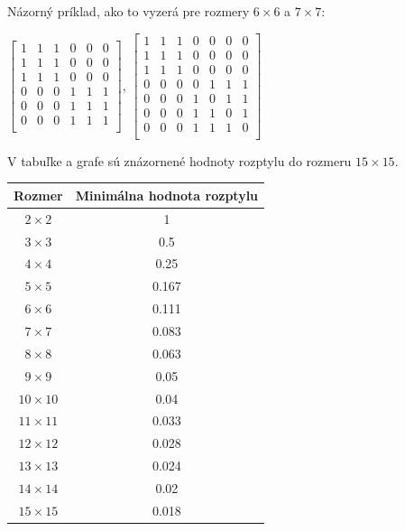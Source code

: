 Názorný príklad, ako to vyzerá pre rozmery $6 \times 6$ a $7 \times 7$:

\begin{center}
$
\begin{bmatrix}
1 & 1 & 1 & 0 & 0 & 0 \\
1 & 1 & 1 & 0 & 0 & 0 \\
1 & 1 & 1 & 0 & 0 & 0 \\
0 & 0 & 0 & 1 & 1 & 1 \\
0 & 0 & 0 & 1 & 1 & 1 \\
0 & 0 & 0 & 1 & 1 & 1 \\
\end{bmatrix}
$,
$
\begin{bmatrix}
1 & 1 & 1 & 0 & 0 & 0 & 0 \\
1 & 1 & 1 & 0 & 0 & 0 & 0 \\
1 & 1 & 1 & 0 & 0 & 0 & 0 \\
0 & 0 & 0 & 0 & 1 & 1 & 1 \\
0 & 0 & 0 & 1 & 0 & 1 & 1 \\
0 & 0 & 0 & 1 & 1 & 0 & 1 \\
0 & 0 & 0 & 1 & 1 & 1 & 0 \\
\end{bmatrix}
$
\end{center}

V tabuľke a grafe sú znázornené hodnoty rozptylu do rozmeru $15 \times 15$.

\begin{center}
\begin{tabular}{ |c|c|}
  \hline
  Rozmer & Minimálna hodnota rozptylu \\ \hline
  $2 \times 2$ & 1 \\ \hline
  $3 \times 3$ & 0.5 \\ \hline
  $4 \times 4$ & 0.25 \\ \hline
  $5 \times 5$ & 0.167 \\ \hline
  $6 \times 6$ & 0.111 \\ \hline
  $7 \times 7$ & 0.083 \\ \hline
  $8 \times 8$ & 0.063 \\ \hline
  $9 \times 9$ & 0.05 \\ \hline
  $10 \times 10$ & 0.04 \\ \hline
  $11 \times 11$ & 0.033 \\ \hline
  $12 \times 12$ & 0.028 \\ \hline
  $13 \times 13$ & 0.024 \\ \hline
  $14 \times 14$ & 0.02 \\ \hline
  $15 \times 15$ & 0.018 \\ \hline
\end{tabular}
\end{center}

